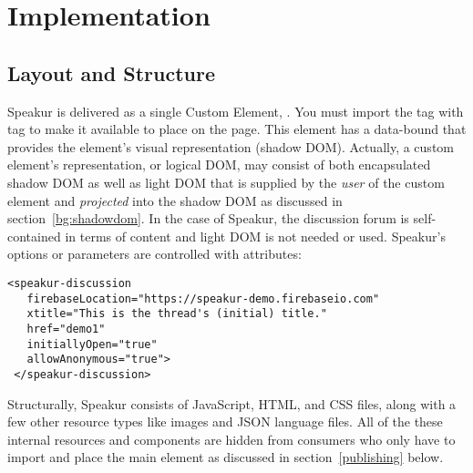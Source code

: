 \chapter{Implementation}
%


\section{Layout and Structure}
\label{sec:layout}

Speakur is delivered as a single Custom Element, .
You must import the tag with  tag to make it available to place on the page. 
This element has a data-bound  that provides the element's visual representation (shadow DOM).
Actually, a custom element's representation, or logical DOM, may consist of both encapsulated shadow DOM as well as light DOM that is supplied by the \textit{user} of the custom element and \textit{projected} into the shadow DOM as discussed in section~\ref{bg:shadowdom}.
In the case of Speakur, the discussion forum is self-contained in terms of content and light DOM is not needed or used.
Speakur's options or parameters are controlled with attributes:

\begin{lstlisting}[language=HTML5,caption=
{Using HTML attributes to set Speakur options},label=l:options1,captionpos=below]
 <speakur-discussion
   firebaseLocation="https://speakur-demo.firebaseio.com"
   xtitle="This is the thread's (initial) title."
   href="demo1"
   initiallyOpen="true"
   allowAnonymous="true">
 </speakur-discussion>
\end{lstlisting}

Structurally, Speakur consists of JavaScript, HTML, and CSS files, along with a few other resource types like images and JSON language files. 
All of the these internal resources and components are hidden from consumers who only have to import and place the main  element as discussed in section~\ref{publishing} below.


